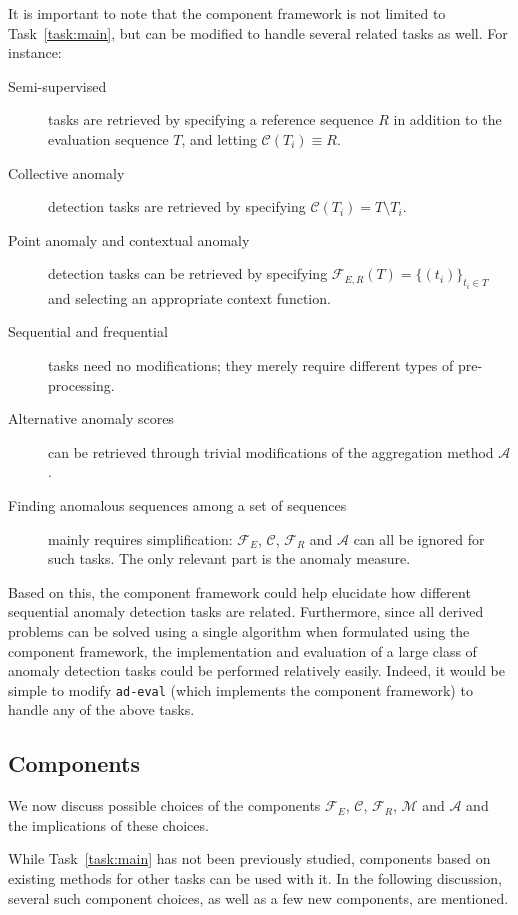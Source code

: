 It is important to note that the component framework is not limited to Task~\ref{task:main}, but can be modified to handle several related tasks as well. For instance:
\begin{description}
    \item[Semi-supervised] tasks are retrieved by specifying a reference sequence $R$ in addition to the evaluation sequence $T$, and letting $\mathcal{C}(T_i) \equiv R$.
    \item[Collective anomaly] detection tasks are retrieved by specifying $\mathcal{C}(T_i) = T \setminus T_i$.
    \item[Point anomaly and contextual anomaly] detection tasks can be retrieved by specifying $\mathcal{F}_{E,R}(T) = {\{(t_i)\}}_{t_i \in T}$ and selecting an appropriate context function.
    \item[Sequential and frequential] tasks need no modifications; they merely require different types of pre-processing.
    \item[Alternative anomaly scores] can be retrieved through trivial modifications of the aggregation method $\mathcal{A}$.
    \item[Finding anomalous sequences among a set of sequences] mainly requires simplification: $\mathcal{F}_E$, $\mathcal{C}$, $\mathcal{F}_R$ and $\mathcal{A}$ can all be ignored for such tasks. The only relevant part is the anomaly measure.
\end{description}

Based on this, the component framework could help elucidate how different sequential anomaly detection tasks are related. Furthermore, since all derived problems can be solved using a single algorithm when formulated using the component framework, the implementation and evaluation of a large class of anomaly detection tasks could be performed relatively easily. Indeed, it would be simple to modify \texttt{ad-eval} (which implements the component framework) to handle any of the above tasks.

\subsection{Components}
\label{sect:deriving_problems}

We now discuss possible choices of the components $\mathcal{F}_E$, $\mathcal{C}$, $\mathcal{F}_R$, $\mathcal{M}$ and $\mathcal{A}$ and the implications of these choices.

While Task~\ref{task:main} has not been previously studied, components based on existing methods for other tasks can be used with it. In the following discussion, several such component choices, as well as a few new components, are mentioned.

